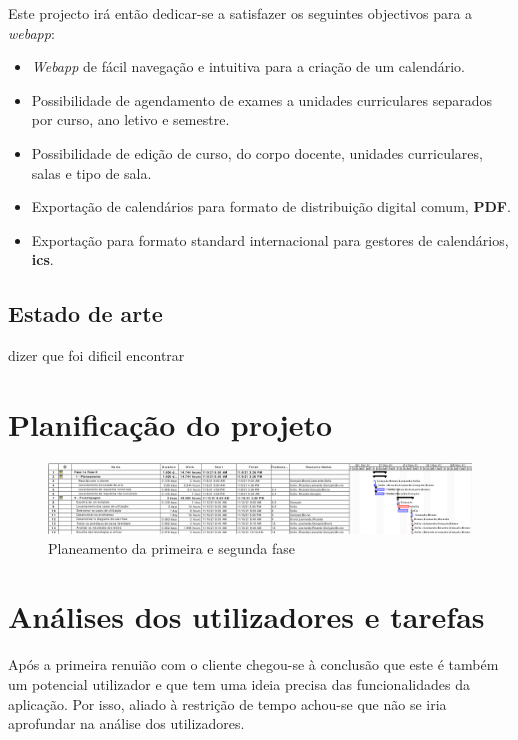 \documentclass[11pt, twoside]{report}
\begin{document}
	Este projecto irá então dedicar-se a satisfazer os seguintes objectivos para a \textit{webapp}: 
	\begin{itemize} 
		\item \textit{Webapp} de fácil navegação e intuitiva para a criação de um calendário. 
		\item Possibilidade de agendamento de exames a unidades curriculares separados por curso, ano letivo e semestre.   
		\item Possibilidade de edição de curso, do corpo docente, unidades curriculares, salas e tipo de sala. 
		\item Exportação de calendários para formato de distribuição digital comum, \textbf{PDF}. 
		\item Exportação para formato standard internacional para gestores de calendários, \textbf{ics}.  
	\end{itemize} 
	\section{Estado de arte}
	
	
	dizer que foi dificil encontrar
	
	\chapter{Planificação do projeto}

 	
		
	\clearpage
	\begin{landscape}
		\pagestyle{empty}
		
		\begin{figure}[H] 
			\centering 			\includegraphics[width=1.4\textwidth,height=1.4\textheight,keepaspectratio]{image/planeamento_1fase}
			\caption{Planeamento da primeira e segunda fase}
			
		\end{figure}
	\end{landscape}
	
	
	\chapter{Análises dos utilizadores e tarefas}
	
	Após a primeira renuião com o cliente chegou-se à conclusão que  este é também um potencial utilizador e que tem uma ideia precisa das funcionalidades da aplicação. Por isso, aliado à restrição de tempo achou-se que não se iria aprofundar na análise dos utilizadores. 
	
\end{document}
